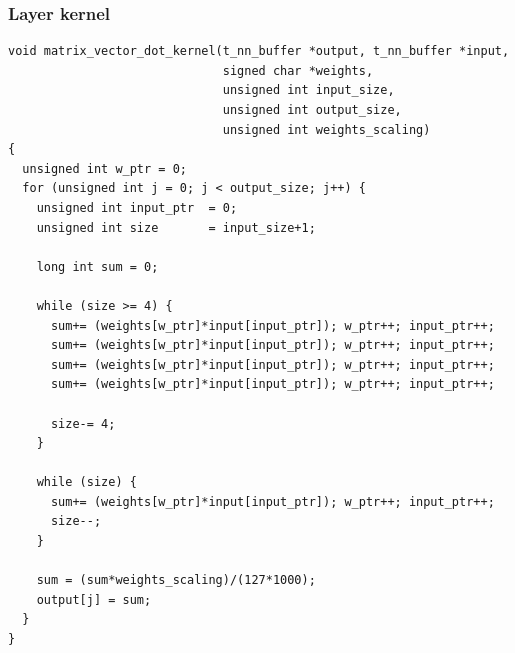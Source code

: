 \documentclass[xcolor=dvipsnames]{beamer}
\begin{document}
\begin{frame}[fragile]
\frametitle{\bf Layer kernel}

{\tiny
  \lstset{language=C++}
\begin{lstlisting}
void matrix_vector_dot_kernel(t_nn_buffer *output, t_nn_buffer *input,
                              signed char *weights,
                              unsigned int input_size,
                              unsigned int output_size,
                              unsigned int weights_scaling)
{
  unsigned int w_ptr = 0;
  for (unsigned int j = 0; j < output_size; j++) {
    unsigned int input_ptr  = 0;
    unsigned int size       = input_size+1;

    long int sum = 0;

    while (size >= 4) {
      sum+= (weights[w_ptr]*input[input_ptr]); w_ptr++; input_ptr++;
      sum+= (weights[w_ptr]*input[input_ptr]); w_ptr++; input_ptr++;
      sum+= (weights[w_ptr]*input[input_ptr]); w_ptr++; input_ptr++;
      sum+= (weights[w_ptr]*input[input_ptr]); w_ptr++; input_ptr++;

      size-= 4;
    }

    while (size) {
      sum+= (weights[w_ptr]*input[input_ptr]); w_ptr++; input_ptr++;
      size--;
    }

    sum = (sum*weights_scaling)/(127*1000);
    output[j] = sum;
  }
}
\end{lstlisting}
}

\end{frame}


\begin{frame}


\end{frame}
\end{document}
